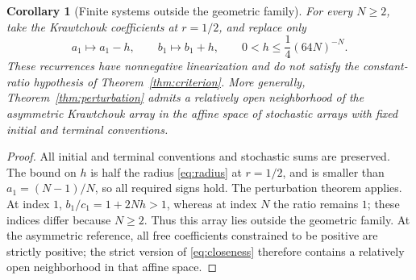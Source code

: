 \documentclass[11pt]{article}
\newtheorem{corollary}[theorem]{Corollary}
\begin{document}
\begin{corollary}[Finite systems outside the geometric family]\label{cor:nonclassical}
For every $N\geq2$, take the Krawtchouk coefficients at $r=1/2$, and replace only
\[
a_1\longmapsto a_1-h,\qquad b_1\longmapsto b_1+h,
\qquad 0<h\leq\frac14(64N)^{-N}.
\]
These recurrences have nonnegative linearization and do not satisfy the constant-ratio hypothesis of Theorem~\ref{thm:criterion}. More generally, Theorem~\ref{thm:perturbation} admits a relatively open neighborhood of the asymmetric Krawtchouk array in the affine space of stochastic arrays with fixed initial and terminal conventions.
\end{corollary}
\begin{proof}
All initial and terminal conventions and stochastic sums are preserved. The bound on $h$ is half the radius \eqref{eq:radius} at $r=1/2$, and is smaller than $a_1=(N-1)/N$, so all required signs hold. The perturbation theorem applies. At index $1$, $b_1/c_1=1+2Nh>1$, whereas at index $N$ the ratio remains $1$; these indices differ because $N\geq2$. Thus this array lies outside the geometric family. At the asymmetric reference, all free coefficients constrained to be positive are strictly positive; the strict version of \eqref{eq:closeness} therefore contains a relatively open neighborhood in that affine space.
\end{proof}
\end{document}
